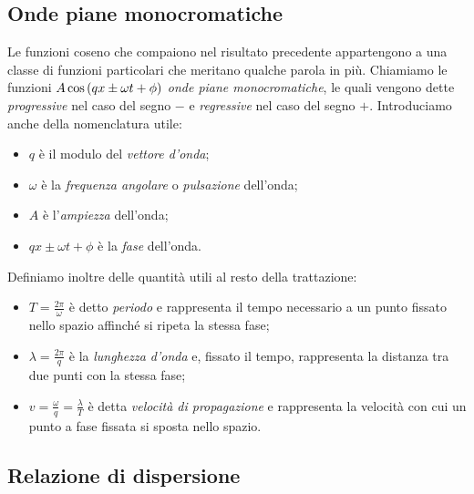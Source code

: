     \subsection{Onde piane monocromatiche}
        Le funzioni coseno che compaiono nel risultato precedente appartengono a una classe di funzioni particolari che meritano qualche parola in pi\`u. Chiamiamo le funzioni $A\cos\qty(qx\pm\omega t+\phi)$ \emph{onde piane monocromatiche}, le quali vengono dette \emph{progressive} nel caso del segno $-$ e \emph{regressive} nel caso del segno $+$. Introduciamo anche della nomenclatura utile\cite{Focardi2014-wy}:
        \begin{itemize}
            \item $q$ \`e il modulo del \emph{vettore d'onda};
            \item $\omega$ \`e la \emph{frequenza angolare} o \emph{pulsazione} dell'onda;
            \item $A$ \`e l'\emph{ampiezza} dell'onda;
            \item $qx\pm\omega t+\phi$ \`e la \emph{fase} dell'onda.
        \end{itemize}
        Definiamo inoltre delle quantit\`a utili al resto della trattazione:
        \begin{itemize}
            \item $\displaystyle T=\frac{2\pi}{\omega}$ \`e detto \emph{periodo} e rappresenta il tempo necessario a un punto fissato nello spazio affinch\'e si ripeta la stessa fase;
            \item $\displaystyle \lambda=\frac{2\pi}{q}$ \`e la \emph{lunghezza d'onda} e, fissato il tempo, rappresenta la distanza tra due punti con la stessa fase;
            \item $\displaystyle v=\frac{\omega}{q}=\frac{\lambda}{T}$ \`e detta \emph{velocit\`a di propagazione} e rappresenta la velocit\`a con cui un punto a fase fissata si sposta nello spazio.
        \end{itemize}
    \subsection{Relazione di dispersione}
